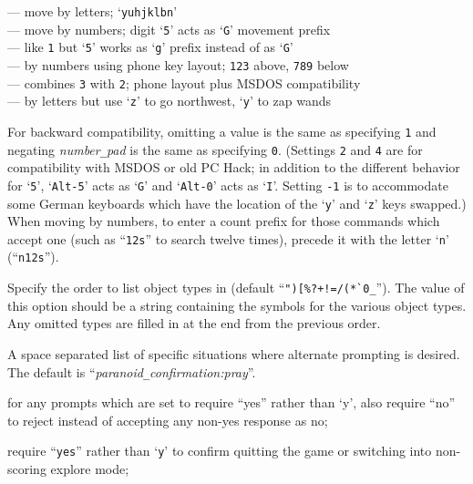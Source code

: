 \newlength{\mwidth}
\settowidth{\mwidth}{\tt -0}
\newcommand{\numbox}[1]{\makebox[\mwidth][r]{{\tt #1}}}
\numbox{0} --- move by letters; `{\tt yuhjklbn}'\\
\numbox{1} --- move by numbers; digit `{\tt 5}' acts as `{\tt G}' movement prefix\\
\numbox{2} --- like {\tt 1} but `{\tt 5}' works as `{\tt g}' prefix instead of as `{\tt G}'\\
\numbox{3} --- by numbers using phone key layout; {\tt 123} above, {\tt 789} below\\
\numbox{4} --- combines {\tt 3} with {\tt 2}; phone layout plus MSDOS compatibility\\
\numbox{-1} --- by letters but use `{\tt z}' to go northwest, `{\tt y}' to zap wands

For backward compatibility, omitting a value is the same as specifying {\tt 1}
and negating
{\it number\verb+_+pad\/}
is the same as specifying {\tt 0}.
(Settings {\tt 2} and {\tt 4} are for compatibility with MSDOS or old PC Hack;
in addition to the different behavior for `{\tt 5}', `{\tt Alt-5}' acts as `{\tt G}'
and `{\tt Alt-0}' acts as `{\tt I}'.
Setting {\tt -1} is to accommodate some German keyboards which have the
location of the `{\tt y}' and `{\tt z}' keys swapped.)
When moving by numbers, to enter a count prefix for those commands
which accept one (such as ``{\tt 12s}'' to search twelve times), precede it
with the letter `{\tt n}' (``{\tt n12s}'').
\item[\ib{packorder}]
Specify the order to list object types in (default
``\verb&")[%?+!=/(*`0_&''). The value of this option should be a string
containing the symbols for the various object types.  Any omitted types
are filled in at the end from the previous order.
\item[\ib{paranoid\verb+_+confirmation}]
A space separated list of specific situations where alternate
prompting is desired.  The default is ``{\it paranoid\verb+_+confirmation:pray}''.
\newlength{\pcwidth}
\settowidth{\pcwidth}{\tt Confirm}
\addtolength{\pcwidth}{\labelsep}
\blist{\leftmargin \pcwidth \topsep 1mm \itemsep 0mm}
\item[{\tt Confirm}]
for any prompts which are set to require ``yes''
rather than `y', also require ``no'' to reject instead
of accepting any non-yes response as no;
\item[{\tt quit~~~}]
require ``{\tt yes}'' rather than `{\tt y}' to confirm quitting
the game or switching into non-scoring explore mode;
